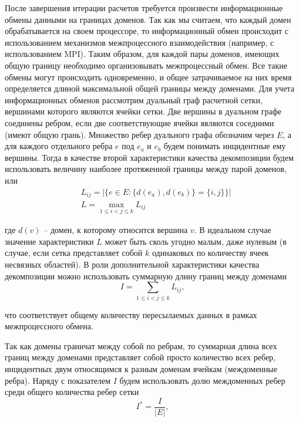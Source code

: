 После завершения итерации расчетов требуется произвести информационные обмены данными на границах доменов.
Так как мы считаем, что каждый домен обрабатывается на своем процессоре, то информационный обмен происходит с использованием механизмов межпроцессного взаимодействия (например, с использованием MPI).
Таким образом, для каждой пары доменов, имеющих общую границу необходимо организовывать межпроцессный обмен.
Все такие обмены могут происходить одновременно, и общее затрачиваемое на них время определяется длиной максимальной общей границы между доменами.
Для учета информационных обменов рассмотрим дуальный граф расчетной сетки, вершинами которого являются ячейки сетки.
Две вершины в дуальном графе соединены ребром, если две соответствующие ячейки являются соседними (имеют общую грань).
Множество ребер дуального графа обозначим через $E$, а для каждого отдельного ребра $e$ под $e_a$ и $e_b$ будем понимать инцидентные ему вершины.
Тогда в качестве второй характеристики качества декомпозиции будем использовать величину наиболее протяженной границы между парой доменов, или
\begin{equation}
	\begin{aligned}
		& L_{ij} = \left| \{ e \in E: \{ d(e_a), d(e_b) \} = \{ i, j \} \} \right| \\
		& L = \max_{1 \le i < j \le k}{L_{ij}}
	\end{aligned}
\end{equation}

где $d(v)$ -- домен, к которому относится вершина $v$.
В идеальном случае значение характеристики $L$ может быть сколь угодно малым, даже нулевым (в случае, если сетка представляет собой $k$ одинаковых по количеству ячеек несвязных областей).
В роли дополнительной характеристики качества декомпозиции можно использовать суммарную длину границ между доменами
\begin{equation}
	I = \sum_{1 \le i < j \le k}{L_{ij}},
\end{equation}

что соответствует общему количеству пересылаемых данных в рамках межпроцессного обмена.

Так как домены граничат между собой по ребрам, то суммарная длина всех границ между доменами представляет собой просто количество всех ребер, инцидентных двум относящимся к разным доменам ячейкам (междоменные ребра).
Наряду с показателем $I$ будем использовать долю междоменных ребер среди общего количества ребер сетки
\begin{equation}
	I^{*} = \frac{I}{|E|},
\end{equation}

